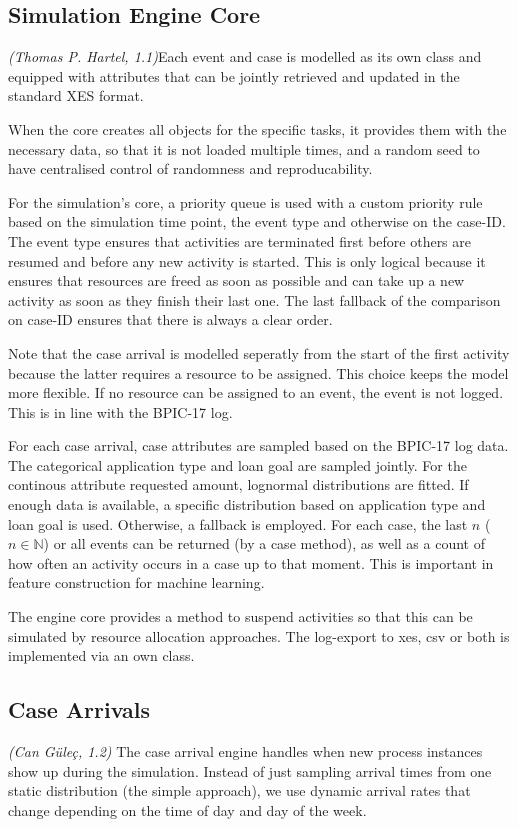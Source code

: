 \documentclass[
  english,
  font=times,
  twocolumn,
]{tumarticle}
\begin{document}
\subsection{Simulation Engine Core}
\textit{(Thomas P. Hartel, 1.1)}\quad Each event and case is modelled as its own class and equipped with attributes that can be jointly retrieved and updated in the standard XES format.

When the core creates all objects for the specific tasks, it provides them with the necessary data, so that it is not loaded multiple times, and a random seed to have centralised control of randomness and reproducability.

For the simulation's core, a priority queue is used with a custom priority rule based on the simulation time point, the event type and otherwise on the case-ID. The event type ensures that activities are terminated first before others are resumed and before any new activity is started. This is only logical because it ensures that resources are freed as soon as possible and can take up a new activity as soon as they finish their last one. The last fallback of the comparison on case-ID ensures that there is always a clear order.

Note that the case arrival is modelled seperatly from the start of the first activity because the latter requires a resource to be assigned. This choice keeps the model more flexible. If no resource can be assigned to an event, the event is not logged. This is in line with the BPIC-17 log.

For each case arrival, case attributes are sampled based on the BPIC-17 log data. The categorical application type and loan goal are sampled jointly. For the continous attribute requested amount, lognormal distributions are fitted. If enough data is available, a specific distribution based on application type and loan goal is used. Otherwise, a fallback is employed. For each case, the last $n$ ($n \in \mathbb N$) or all events can be returned (by a case method), as well as a count of how often an activity occurs in a case up to that moment. This is important in feature construction for machine learning. 

The engine core provides a method to suspend activities so that this can be simulated by resource allocation approaches.
The log-export to xes, csv or both is implemented via an own class.

\subsection{Case Arrivals} \textit{(Can Güleç, 1.2)}
The case arrival engine handles when new process instances show up during the simulation. Instead of just sampling arrival times from one static distribution (the simple approach), we use dynamic arrival rates that change depending on the time of day and day of the week. 
\end{document}
